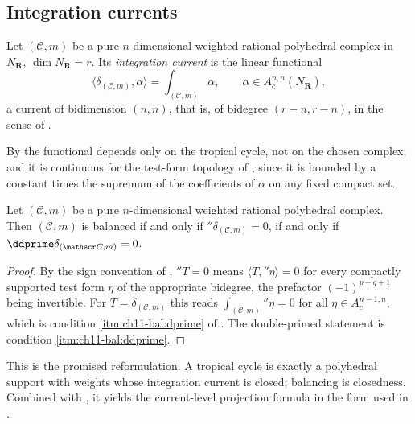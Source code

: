 \subsection{Integration currents}
\label{sec:ch11-integration-current}

\begin{definition}
\label{def:ch11-integration-current}
Let $(\mathscr C,m)$ be a pure $n$-dimensional weighted rational polyhedral
complex in $N_{\mathbf R}$, $\dim N_{\mathbf R}=r$.  Its \emph{integration
current} is the linear functional
\[
 \bigl\langle\delta_{(\mathscr C,m)},\alpha\bigr\rangle
 =\int_{(\mathscr C,m)}\alpha ,
 \qquad \alpha\in A^{n,n}_c(N_{\mathbf R}),
\]
a current of bidimension $(n,n)$, that is, of bidegree $(r-n,r-n)$, in the
sense of .
\end{definition}

By  the functional depends only on
the tropical cycle, not on the chosen complex; and it is continuous for the
test-form topology of , since it is bounded by a
constant times the supremum of the coefficients of $\alpha$ on any fixed
compact set.

\begin{theorem}
\label{thm:ch11-current-closed}
Let $(\mathscr C,m)$ be a pure $n$-dimensional weighted rational polyhedral
complex.  Then $(\mathscr C,m)$ is balanced if and only if
$\dprime\delta_{(\mathscr C,m)}=0$, if and only if
$\ddprime\delta_{(\mathscr C,m)}=0$.
\end{theorem}

\begin{proof}
By the sign convention of , $\dprime T=0$ means
$\langle T,\dprime\eta\rangle=0$ for every compactly supported test form
$\eta$ of the appropriate bidegree, the prefactor $(-1)^{p+q+1}$ being
invertible.  For $T=\delta_{(\mathscr C,m)}$ this reads
$\int_{(\mathscr C,m)}\dprime\eta=0$ for all
$\eta\in A^{n-1,n}_c$, which is condition
\cref{itm:ch11-bal:dprime} of .  The
double-primed statement is condition \cref{itm:ch11-bal:ddprime}.
\end{proof}

This is the promised reformulation.  A tropical cycle is exactly a
polyhedral support with weights whose integration current is closed;
balancing is closedness.  Combined with ,
it yields the current-level projection formula in the form used in
.

